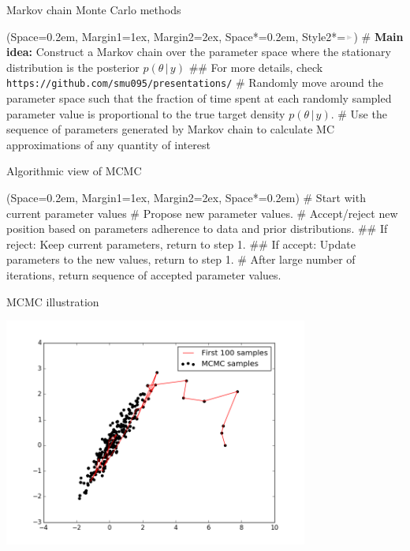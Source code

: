 \documentclass[12pt, aspectratio=149]{beamer}
\newcommand{\listSpace}{0.2em}
\theoremstyle{plain}
\begin{document}
\begin{frame}[fragile]{Markov chain Monte Carlo methods}
	\begin{easylist}
		\ListProperties(Space=\listSpace, Margin1=1ex, Margin2=2ex, Space*=\listSpace, Style2*=$\color{bggraydark}\blacktriangleright$\space)
		# \textbf{Main idea:} Construct a Markov chain over the parameter space where the stationary distribution is the posterior $p(\theta \,\vert\, y)$
		## For more details, check \footnotesize\texttt{https://github.com/smu095/presentations/}
		# Randomly move around the parameter space such that the fraction of time spent at each randomly sampled parameter value is proportional to the true target density $p(\theta \,\vert\,y)$.
		# Use the sequence of parameters generated by Markov chain to calculate MC approximations of any quantity of interest
	\end{easylist}
\end{frame}

\begin{frame}[fragile]{Algorithmic view of MCMC}
	\begin{easylist}[enumerate]
		\ListProperties(Space=\listSpace, Margin1=1ex, Margin2=2ex, Space*=\listSpace)
		# Start with current parameter values
		# Propose new parameter values.
		# Accept/reject new position based on parameters adherence to data and prior distributions.
		## If reject: Keep current parameters, return to step 1.
		## If accept: Update parameters to the new values, return to step 1.
		# After large number of iterations, return sequence of accepted parameter values.
	\end{easylist}
\end{frame}

\begin{frame}{MCMC illustration}
\begin{center}
\includegraphics[width=0.75\textwidth]{figs/mcmc_illustration.png}
\end{center}
\end{frame}
\end{document}
